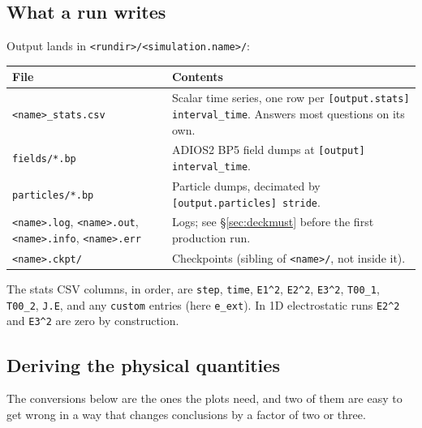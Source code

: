 \documentclass[11pt,a4paper]{article}
\newcommand{\code}[1]{\texttt{\small #1}}
\begin{document}
\subsection{What a run writes}

Output lands in \code{<rundir>/<simulation.name>/}:

\begin{center}\small
\begin{tabular}{@{}lp{9.4cm}@{}}
\toprule
File & Contents \\
\midrule
\code{<name>\_stats.csv} & Scalar time series, one row per
   \code{[output.stats] interval\_time}. Answers most questions on its own. \\
\code{fields/*.bp}       & ADIOS2 BP5 field dumps at \code{[output] interval\_time}. \\
\code{particles/*.bp}    & Particle dumps, decimated by \code{[output.particles] stride}. \\
\code{<name>.log}, \code{<name>.out}, \code{<name>.info}, \code{<name>.err} & Logs; see
   \S\ref{sec:deckmust} before the first production run. \\
\code{<name>.ckpt/}      & Checkpoints (sibling of \code{<name>/}, not inside it). \\
\bottomrule
\end{tabular}
\end{center}

The stats CSV columns, in order, are
\code{step}, \code{time}, \code{E1\^{}2}, \code{E2\^{}2}, \code{E3\^{}2},
\code{T00\_1}, \code{T00\_2}, \code{J.E}, and any \code{custom} entries
(here \code{e\_ext}). In 1D electrostatic runs \code{E2\^{}2} and \code{E3\^{}2} are
zero by construction.

\subsection{Deriving the physical quantities}

The conversions below are the ones the plots need, and two of them are easy to get
wrong in a way that changes conclusions by a factor of two or three.
\end{document}
